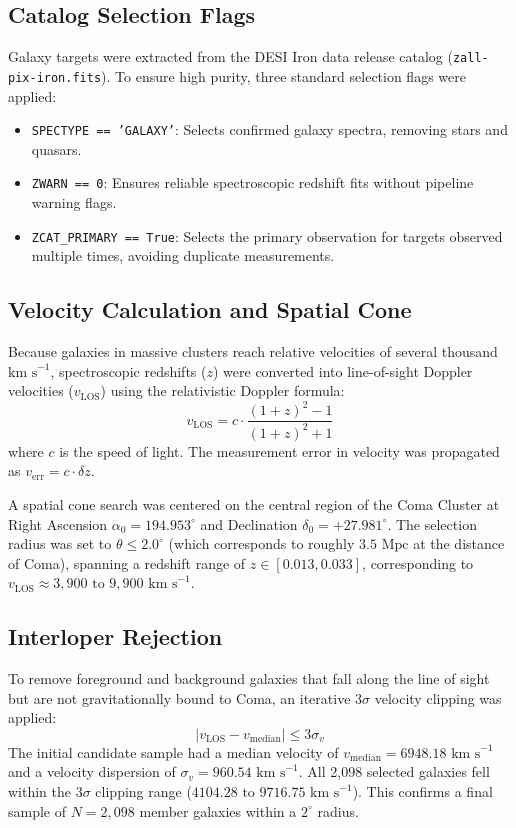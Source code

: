 \documentclass[twocolumn]{aastex631}
\begin{document}
\subsection{Catalog Selection Flags}
Galaxy targets were extracted from the DESI Iron data release catalog (\texttt{zall-pix-iron.fits}). To ensure high purity, three standard selection flags were applied:
\begin{itemize}
	\item \texttt{SPECTYPE == 'GALAXY'}: Selects confirmed galaxy spectra, removing stars and quasars.
	\item \texttt{ZWARN == 0}: Ensures reliable spectroscopic redshift fits without pipeline warning flags.
	\item \texttt{ZCAT\_PRIMARY == True}: Selects the primary observation for targets observed multiple times, avoiding duplicate measurements.
\end{itemize}

\subsection{Velocity Calculation and Spatial Cone}
Because galaxies in massive clusters reach relative velocities of several thousand $\text{km s}^{-1}$, spectroscopic redshifts ($z$) were converted into line-of-sight Doppler velocities ($v_{\text{LOS}}$) using the relativistic Doppler formula:
\begin{equation}
	v_{\text{LOS}} = c \cdot \frac{(1+z)^2 - 1}{(1+z)^2 + 1}
\end{equation}
where $c$ is the speed of light. The measurement error in velocity was propagated as $v_{\text{err}} = c \cdot \delta z$.

A spatial cone search was centered on the central region of the Coma Cluster at Right Ascension $\alpha_0 = 194.953^\circ$ and Declination $\delta_0 = +27.981^\circ$. The selection radius was set to $\theta \le 2.0^\circ$ (which corresponds to roughly $3.5\text{ Mpc}$ at the distance of Coma), spanning a redshift range of $z \in [0.013, 0.033]$, corresponding to $v_{\text{LOS}} \approx 3{,}900\text{ to }9{,}900\text{ km s}^{-1}$.

\subsection{Interloper Rejection}
To remove foreground and background galaxies that fall along the line of sight but are not gravitationally bound to Coma, an iterative $3\sigma$ velocity clipping was applied:
\begin{equation}
	|v_{\text{LOS}} - v_{\text{median}}| \le 3\sigma_v
\end{equation}
The initial candidate sample had a median velocity of $v_{\text{median}} = 6948.18\text{ km s}^{-1}$ and a velocity dispersion of $\sigma_v = 960.54\text{ km s}^{-1}$. All 2,098 selected galaxies fell within the $3\sigma$ clipping range ($4104.28\text{ to }9716.75\text{ km s}^{-1}$). This confirms a final sample of $N = 2{,}098$ member galaxies within a $2^\circ$ radius.
\end{document}
